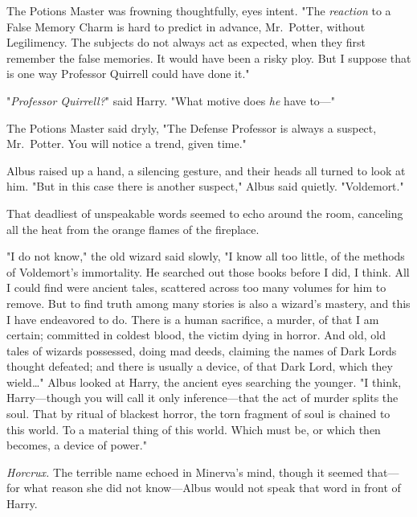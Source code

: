 The Potions Master was frowning thoughtfully, eyes intent. "The \emph{reaction} to a False Memory Charm is hard to predict in advance, Mr.~Potter, without Legilimency. The subjects do not always act as expected, when they first remember the false memories. It would have been a risky ploy. But I suppose that is one way Professor Quirrell could have done it."

"\emph{Professor Quirrell?}" said Harry. "What motive does \emph{he} have to---"

The Potions Master said dryly, "The Defense Professor is always a suspect, Mr.~Potter. You will notice a trend, given time."

Albus raised up a hand, a silencing gesture, and their heads all turned to look at him. "But in this case there is another suspect," Albus said quietly. "Voldemort."

That deadliest of unspeakable words seemed to echo around the room, canceling all the heat from the orange flames of the fireplace.

"I do not know," the old wizard said slowly, "I know all too little, of the methods of Voldemort's immortality. He searched out those books before I did, I think. All I could find were ancient tales, scattered across too many volumes for him to remove. But to find truth among many stories is also a wizard's mastery, and this I have endeavored to do. There is a human sacrifice, a murder, of that I am certain; committed in coldest blood, the victim dying in horror. And old, old tales of wizards possessed, doing mad deeds, claiming the names of Dark Lords thought defeated; and there is usually a device, of that Dark Lord, which they wield{\ldots}" Albus looked at Harry, the ancient eyes searching the younger. "I think, Harry---though you will call it only inference---that the act of murder splits the soul. That by ritual of blackest horror, the torn fragment of soul is chained to this world. To a material thing of this world. Which must be, or which then becomes, a device of power."

\emph{Horcrux.} The terrible name echoed in Minerva's mind, though it seemed that---for what reason she did not know---Albus would not speak that word in front of Harry.

